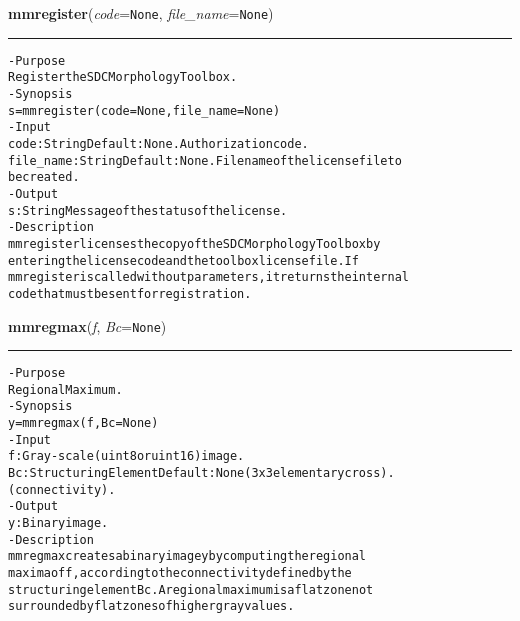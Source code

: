     \begin{boxedminipage}{\textwidth}

    \raggedright \textbf{mmregister}(\textit{code}=\texttt{N\-o\-n\-e\-}, \textit{file\_name}=\texttt{N\-o\-n\-e\-})

    \vspace{-1.5ex}

    \rule{\textwidth}{0.5\fboxrule}
\begin{alltt}
- Purpose
    Register the SDC Morphology Toolbox.
- Synopsis
    s = mmregister(code=None, file\_name=None)
- Input
    code:      String Default: None. Authorization code.
    file\_name: String Default: None. Filename of the license file to
               be created.
- Output
    s: String Message of the status of the license.
- Description
    mmregister licenses the copy of the SDC Morphology Toolbox by
    entering the license code and the toolbox license file. If
    mmregister is called without parameters, it returns the internal
    code that must be sent for registration.\end{alltt}

    \vspace{1ex}

    \end{boxedminipage}

    \label{multireg:num_pymorph:mmregmax}
    \vspace{0.5ex}

    \begin{boxedminipage}{\textwidth}

    \raggedright \textbf{mmregmax}(\textit{f}, \textit{Bc}=\texttt{N\-o\-n\-e\-})

    \vspace{-1.5ex}

    \rule{\textwidth}{0.5\fboxrule}
\begin{alltt}
- Purpose
    Regional Maximum.
- Synopsis
    y = mmregmax(f, Bc=None)
- Input
    f:  Gray-scale (uint8 or uint16) image.
    Bc: Structuring Element Default: None (3x3 elementary cross).
        (connectivity).
- Output
    y: Binary image.
- Description
    mmregmax creates a binary image y by computing the regional
    maxima of f , according to the connectivity defined by the
    structuring element Bc . A regional maximum is a flat zone not
    surrounded by flat zones of higher gray values.\end{alltt}

    \vspace{1ex}

    \end{boxedminipage}

